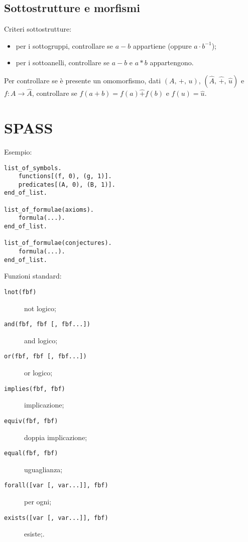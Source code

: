\documentclass[10pt]{article}
\begin{document}
        \subsection*{Sottostrutture e morfismi}

            Criteri sottostrutture:
            \begin{itemize}
                \item per i sottogruppi, controllare se \(a - b\) appartiene (oppure \(a \cdot b^{-1}\));
                \item per i sottoanelli, controllare se \(a - b\) e \(a * b\) appartengono.
            \end{itemize}

            Per controllare se è presente un omomorfismo, dati \((A, \, +, \, u)\), \((\hat{A}, \, \hat{+}, \, \hat{u})\) e
            \(f : A \to \hat{A}\), controllare se \(f(a + b) = f(a) \hat{+} f(b)\) e \(f(u) = \hat{u}\).

    \section*{SPASS}

            \begin{minipage}[h]{.4\textwidth}
                Esempio:
                \begin{verbatim}
list_of_symbols.
    functions[(f, 0), (g, 1)].
    predicates[(A, 0), (B, 1)].
end_of_list.

list_of_formulae(axioms).
    formula(...).
end_of_list.

list_of_formulae(conjectures).
    formula(...).
end_of_list.
                \end{verbatim}
            \end{minipage}
            \begin{minipage}[h]{.6\textwidth}
                Funzioni standard:
                \begin{description}
                    \item[\texttt{lnot(fbf)}] not logico;
                    \item[\texttt{and(fbf, fbf [, fbf...])}] and logico;
                    \item[\texttt{or(fbf, fbf [, fbf...])}] or logico;
                    \item[\texttt{implies(fbf, fbf)}] implicazione;
                    \item[\texttt{equiv(fbf, fbf)}] doppia implicazione;
                    \item[\texttt{equal(fbf, fbf)}] uguaglianza;
                    \item[\texttt{forall([var [, var...]], fbf)}] per ogni;
                    \item[\texttt{exists([var [, var...]], fbf)}] esiste;.
                \end{description}
            \end{minipage}
\end{document}
